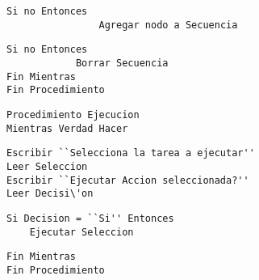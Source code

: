             
\begin{table}[]
\begin{tiny}
\begin{lstlisting}[style=C]            
            Si no Entonces
                Agregar nodo a Secuencia

\end{lstlisting}
\end{tiny}
\end{table}
		
		
\begin{table}[]
\begin{tiny}
\begin{lstlisting}[style=C]		
		Si no Entonces
            Borrar Secuencia
Fin Mientras
Fin Procedimiento 

\end{lstlisting}
\end{tiny}
\end{table}


\begin{table}[]
\begin{tiny}
\begin{lstlisting}[style=C]
Procedimiento Ejecucion
Mientras Verdad Hacer

\end{lstlisting}
\end{tiny}
\end{table}


\begin{table}[]
\begin{tiny}
\begin{lstlisting}[style=C]
Escribir ``Selecciona la tarea a ejecutar''
Leer Seleccion
Escribir ``Ejecutar Accion seleccionada?''
Leer Decisi\'on

\end{lstlisting}
\end{tiny}
\end{table}


\begin{table}[]
\begin{tiny}
\begin{lstlisting}[style=C]
Si Decision = ``Si'' Entonces
	Ejecutar Seleccion

\end{lstlisting}
\end{tiny}
\end{table}


\begin{table}[]
\begin{tiny}
\begin{lstlisting}[style=C]
Fin Mientras
Fin Procedimiento

\end{lstlisting}
\end{tiny}
\end{table}
